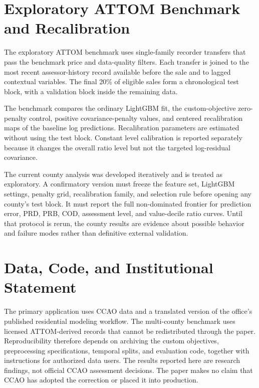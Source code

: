 \documentclass[10pt]{article}
\theoremstyle{definition}
\newcommand{\1}{\mathbf{1}}
\newcommand{\advisorchange}[1]{{\color{blue}#1}}
\begin{document}
\section{Exploratory ATTOM Benchmark and Recalibration}
\label{app:attom}


The exploratory ATTOM benchmark uses single-family recorder transfers \advisorchange{that pass the benchmark price and data-quality filters}. Each transfer is joined to the most recent assessor-history record available before the sale and to lagged contextual variables. The final 20\% of eligible sales form a chronological test block, with a validation block inside the remaining data.

The benchmark compares the ordinary LightGBM fit, the custom-objective zero-penalty control, positive covariance-penalty values, and centered recalibration maps of the baseline log predictions. Recalibration parameters are estimated without using the test block. Constant level calibration is reported separately because it changes the overall ratio level but not the targeted log-residual covariance.

The current county analysis was developed iteratively and is treated as exploratory. A confirmatory version must freeze the feature set, LightGBM settings, penalty grid, recalibration family, and selection rule before opening any county's test block. It must report the full non-dominated frontier for prediction error, PRD, PRB, COD, assessment level, and value-decile ratio curves. Until that protocol is rerun, the county results are evidence about possible behavior and failure modes rather than definitive external validation.

\section*{Data, Code, and Institutional Statement}

\advisorchange{The primary application uses CCAO data} and a translated version of the office's published residential modeling workflow. The multi-county benchmark uses licensed ATTOM-derived records that cannot be redistributed through the paper. Reproducibility therefore depends on archiving the custom objectives, preprocessing specifications, temporal splits, and evaluation code, together with instructions for authorized data users. The results reported here are research findings, not official CCAO assessment decisions. The paper makes no claim that CCAO has adopted the correction or placed it into production.
\end{document}
